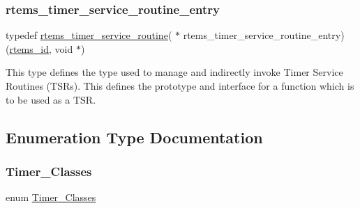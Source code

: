 \subsubsection{\texorpdfstring{rtems\_timer\_service\_routine\_entry}{rtems\_timer\_service\_routine\_entry}}
{\footnotesize\ttfamily typedef \mbox{\hyperlink{group__ClassicTimer_gaa5c0d66d51a2f94638228014deb0ee0f}{rtems\+\_\+timer\+\_\+service\+\_\+routine}}( $\ast$ rtems\+\_\+timer\+\_\+service\+\_\+routine\+\_\+entry) (\mbox{\hyperlink{group__ClassicTasks_gab20892b814dced7dd4e5b9bf42becd57}{rtems\+\_\+id}}, void $\ast$)}

This type defines the type used to manage and indirectly invoke Timer Service Routines (T\+S\+Rs). This defines the prototype and interface for a function which is to be used as a T\+SR. 

\subsection{Enumeration Type Documentation}
\mbox{\label{group__ClassicTimer_gaca88ac1e833f63ec72d38e07677f2f27}} 
\subsubsection{\texorpdfstring{Timer\_Classes}{Timer\_Classes}}
{\footnotesize\ttfamily enum \mbox{\hyperlink{group__ClassicTimer_gaca88ac1e833f63ec72d38e07677f2f27}{Timer\+\_\+\+Classes}}}


